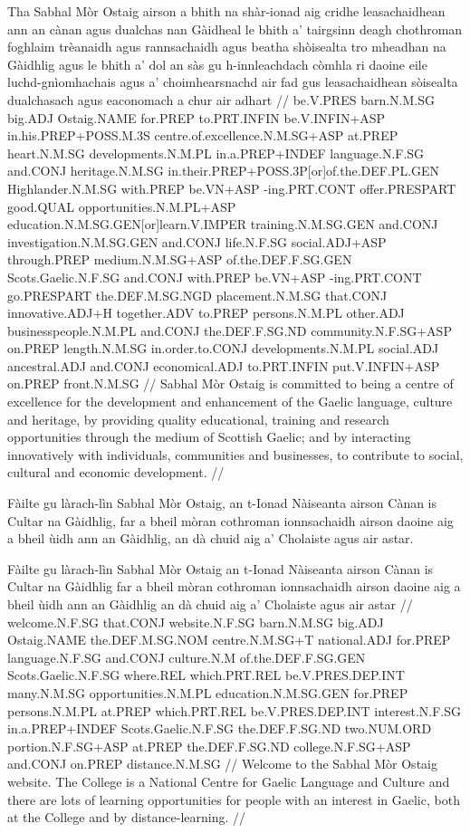 \documentclass[a4paper,10pt]{article}
\begin{document}
\vspace{4mm}
\gla Tha Sabhal Mòr Ostaig airson a bhith na shàr-ionad aig cridhe leasachaidhean {ann an} cànan agus dualchas nan Gàidheal le bhith a' tairgsinn deagh chothroman foghlaim trèanaidh agus rannsachaidh agus beatha shòisealta tro mheadhan na Gàidhlig agus le bhith a' dol an sàs gu h-innleachdach còmhla ri daoine eile luchd-gnìomhachais agus a' choimhearsnachd air fad gus leasachaidhean sòisealta dualchasach agus eaconomach a chur air adhart  //
\glb be.V.PRES barn.N.M.SG big.ADJ Ostaig.NAME for.PREP to.PRT.INFIN be.V.INFIN+ASP in.his.PREP+POSS.M.3S centre.of.excellence.N.M.SG+ASP at.PREP heart.N.M.SG developments.N.M.PL in.a.PREP+INDEF language.N.F.SG and.CONJ heritage.N.M.SG in.their.PREP+POSS.3P[or]of.the.DEF.PL.GEN Highlander.N.M.SG with.PREP be.VN+ASP -ing.PRT.CONT offer.PRESPART good.QUAL opportunities.N.M.PL+ASP education.N.M.SG.GEN[or]learn.V.IMPER training.N.M.SG.GEN and.CONJ investigation.N.M.SG.GEN and.CONJ life.N.F.SG social.ADJ+ASP through.PREP medium.N.M.SG+ASP of.the.DEF.F.SG.GEN Scots.Gaelic.N.F.SG and.CONJ with.PREP be.VN+ASP -ing.PRT.CONT go.PRESPART the.DEF.M.SG.NGD placement.N.M.SG that.CONJ innovative.ADJ+H together.ADV to.PREP persons.N.M.PL other.ADJ businesspeople.N.M.PL and.CONJ the.DEF.F.SG.ND community.N.F.SG+ASP on.PREP length.N.M.SG in.order.to.CONJ developments.N.M.PL social.ADJ ancestral.ADJ and.CONJ economical.ADJ to.PRT.INFIN put.V.INFIN+ASP on.PREP front.N.M.SG  //
\glft Sabhal Mòr Ostaig is committed to being a centre of excellence for the development and enhancement of the Gaelic language, culture and heritage, by providing quality educational, training and research opportunities through the medium of Scottish Gaelic; and by interacting innovatively with individuals, communities and businesses, to contribute to social, cultural and economic development. //
\endgl
\xe

\ex
\begingl
\glpre Fàilte gu làrach-lìn Sabhal Mòr Ostaig, an t-Ionad Nàiseanta airson Cànan is Cultar na Gàidhlig, far a bheil mòran cothroman ionnsachaidh airson daoine aig a bheil ùidh ann an Gàidhlig, an dà chuid aig a' Cholaiste agus air astar. 

\vspace{4mm}
\gla Fàilte gu làrach-lìn Sabhal Mòr Ostaig an t-Ionad Nàiseanta airson Cànan is Cultar na Gàidhlig far a bheil mòran cothroman ionnsachaidh airson daoine aig a bheil ùidh {ann an} Gàidhlig an dà chuid aig a' Cholaiste agus air astar  //
\glb welcome.N.F.SG that.CONJ website.N.F.SG barn.N.M.SG big.ADJ Ostaig.NAME the.DEF.M.SG.NOM centre.N.M.SG+T national.ADJ for.PREP language.N.F.SG and.CONJ culture.N.M of.the.DEF.F.SG.GEN Scots.Gaelic.N.F.SG where.REL which.PRT.REL be.V.PRES.DEP.INT many.N.M.SG opportunities.N.M.PL education.N.M.SG.GEN for.PREP persons.N.M.PL at.PREP which.PRT.REL be.V.PRES.DEP.INT interest.N.F.SG in.a.PREP+INDEF Scots.Gaelic.N.F.SG the.DEF.F.SG.ND two.NUM.ORD portion.N.F.SG+ASP at.PREP the.DEF.F.SG.ND college.N.F.SG+ASP and.CONJ on.PREP distance.N.M.SG  //
\glft Welcome to the Sabhal Mòr Ostaig website. The College is a National Centre for Gaelic Language and Culture and there are lots of learning opportunities for people with an interest in Gaelic, both at the College and by distance-learning. //
\endgl
\xe
\end{document}
